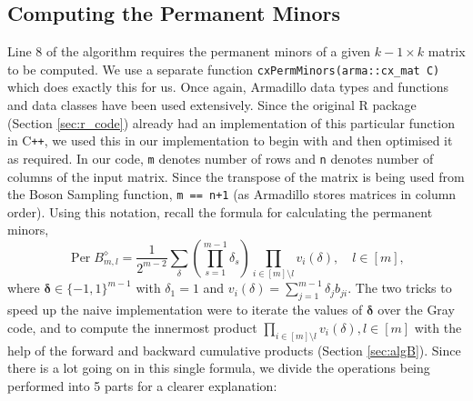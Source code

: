 \documentclass[ %
                    author={Manan Vaswani},
                supervisor={Dr. Raphael Clifford},
                    degree={MEng},
                     title={A multi-core CPU implementation of the classical Boson Sampling algorithm},
                  subtitle={},
                      type={},
                      year={2019} ]{dissertation}
\theoremstyle{plain}
\theoremstyle{definition}
\DeclareMathOperator*{\Per}{\mathrm{Per}}
\begin{document}
\subsection{Computing the Permanent Minors} \label{sec:permMinors}
Line 8 of the algorithm requires the permanent minors of a given $k-1 \times k$ matrix to be computed. We use a separate function \texttt{cxPermMinors(arma::cx_mat C)} which does exactly this for us. Once again, Armadillo data types and functions and data classes have been used extensively. Since the original R package (Section \ref{sec:r_code}) already had an implementation of this particular function in C\texttt{++}, we used this in our implementation to begin with and then optimised it as required. In our code, \texttt{m} denotes number of rows and \texttt{n} denotes number of columns of the input matrix. Since the transpose of the matrix is being used from the Boson Sampling function, \texttt{m == n+1} (as Armadillo stores matrices in column order). Using this notation, recall the formula for calculating the permanent minors,
\begin{equation} \label{eq:permMinors}
\Per B_{m, l}^{\diamond} = \frac{1}{2^{m-2}} \sum_\delta \left( \prod_{s=1}^{m-1} \delta_s \right) \prod_{i \in [m] \setminus l} v_i (\delta), \quad l \in [m],
\end{equation}
where $\mathbf{\delta} \in \{-1, 1\}^{m-1}$ with $\delta_1 = 1$ and $v_i (\delta) = \sum_{j=1}^{m-1} \delta_j b_{ji}$. The two tricks to speed up the naive implementation were to iterate the values of $\mathbf{\delta}$ over the Gray code, and to compute the innermost product $\prod_{i \in [m] \setminus l} v_i (\delta), l \in [m]$ with the help of the forward and backward cumulative products (Section \ref{sec:algB}). Since there is a lot going on in this single formula, we divide the operations being performed into 5 parts for a clearer explanation:
\end{document}
